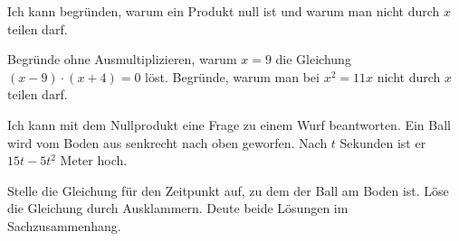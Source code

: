 \begin{aufgabe}{Ich kann begründen, warum ein Produkt null ist und warum man nicht durch $x$ teilen darf.}
\begin{teile}
\teil Begründe ohne Ausmultiplizieren, warum $x = 9$ die Gleichung $(x - 9) \cdot (x + 4) = 0$ löst.
\teil Begründe, warum man bei $x^2 = 11x$ nicht durch $x$ teilen darf.
\end{teile}
\end{aufgabe}

\begin{aufgabe}{Ich kann mit dem Nullprodukt eine Frage zu einem Wurf beantworten. Ein Ball wird vom Boden aus senkrecht nach oben geworfen. Nach $t$ Sekunden ist er $15t - 5t^2$ Meter hoch.}
\begin{teile}
\teil Stelle die Gleichung für den Zeitpunkt auf, zu dem der Ball am Boden ist.
\teil Löse die Gleichung durch Ausklammern.
\teil Deute beide Lösungen im Sachzusammenhang.
\end{teile}
\end{aufgabe}
